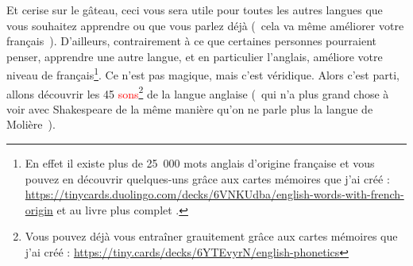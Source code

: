 Et cerise sur le gâteau, ceci
vous sera utile pour toutes les autres langues que vous souhaitez
apprendre ou que vous parlez déjà (~cela va même améliorer votre
français~). D'ailleurs, contrairement à ce que certaines personnes
pourraient penser, apprendre une autre langue, et en particulier
l'anglais, améliore votre niveau de français\footnote{En effet il existe plus de 25~000 mots anglais
  d'origine française et vous pouvez en découvrir quelques-uns grâce
  aux cartes mémoires que j'ai créé :
  \url{https://tinycards.duolingo.com/decks/6VNKUdba/english-words-with-french-origin}
et au livre plus complet \HSQMYP.}. Ce n'est pas magique,
mais c'est véridique. Alors c'est parti, allons découvrir les 45 \textcolor{red}{sons}\footnote{Vous pouvez déjà vous entraîner grauitement grâce
  aux cartes mémoires que j'ai créé : \url{https://tiny.cards/decks/6YTEvyrN/english-phonetics}}
de la langue anglaise (~qui n'a plus grand chose à voir avec
Shakespeare de la même manière qu'on ne parle plus la langue de
Molière~).
